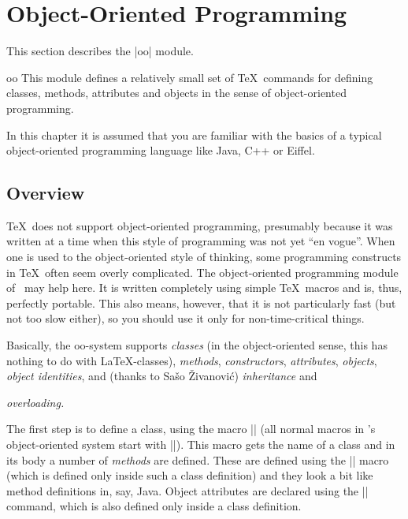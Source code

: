 %
%
%


\section{Object-Oriented Programming}
\label{section-oop}

This section describes the |oo| module.

\begin{pgfmodule}{oo}
    This module defines a relatively small set of \TeX\ commands for defining
    classes, methods, attributes and objects in the sense of object-oriented
    programming.
\end{pgfmodule}

In this chapter it is assumed that you are familiar with the basics of a
typical object-oriented programming language like Java, C++ or Eiffel.


\subsection{Overview}

\TeX\ does not support object-oriented programming, presumably because it was
written at a time when this style of programming was not yet ``en vogue''. When
one is used to the object-oriented style of thinking, some programming
constructs in \TeX\ often seem overly complicated. The object-oriented
programming module of \pgfname\ may help here. It is written completely using
simple \TeX\ macros and is, thus, perfectly portable. This also means, however,
that it is not particularly fast (but not too slow either), so you should use
it only for non-time-critical things.

Basically, the oo-system supports \emph{classes} (in the object-oriented sense,
this has nothing to do with \LaTeX-classes), \emph{methods},
\emph{constructors}, \emph{attributes}, \emph{objects}, \emph{object
identities}, and (thanks to Sašo Živanović) \emph{inheritance} and

\emph{overloading.}

The first step is to define a class, using the macro |\pgfooclass| (all normal
macros in \pgfname's object-oriented system start with |\pgfoo|). This macro
gets the name of a class and in its body a number of \emph{methods} are
defined. These are defined using the |\method| macro (which is defined only
inside such a class definition) and they look a bit like method definitions in,
say, Java. Object attributes are declared using the |\attribute| command, which
is also defined only inside a class definition.

